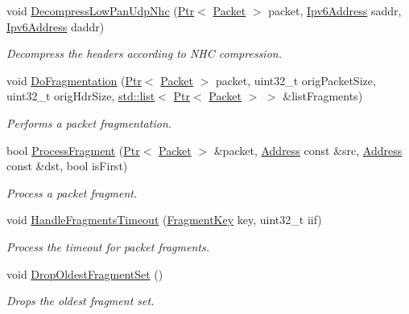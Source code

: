 \begin{DoxyCompactItemize}
void \hyperlink{classns3_1_1SixLowPanNetDevice_a0b31fbe0bdc3a4dd59b9f7426aec8ed8}{Decompress\+Low\+Pan\+Udp\+Nhc} (\hyperlink{classns3_1_1Ptr}{Ptr}$<$ \hyperlink{classns3_1_1Packet}{Packet} $>$ packet, \hyperlink{classns3_1_1Ipv6Address}{Ipv6\+Address} saddr, \hyperlink{classns3_1_1Ipv6Address}{Ipv6\+Address} daddr)
\begin{DoxyCompactList}\small\item\em Decompress the headers according to N\+HC compression. \end{DoxyCompactList}\item 
void \hyperlink{classns3_1_1SixLowPanNetDevice_a88e96024b9eb0c0184c9c1ef26e3aa16}{Do\+Fragmentation} (\hyperlink{classns3_1_1Ptr}{Ptr}$<$ \hyperlink{classns3_1_1Packet}{Packet} $>$ packet, uint32\+\_\+t orig\+Packet\+Size, uint32\+\_\+t orig\+Hdr\+Size, \hyperlink{openflow-interface_8h_afd9bcfa176617760671b67580f536fa7}{std\+::list}$<$ \hyperlink{classns3_1_1Ptr}{Ptr}$<$ \hyperlink{classns3_1_1Packet}{Packet} $>$ $>$ \&list\+Fragments)
\begin{DoxyCompactList}\small\item\em Performs a packet fragmentation. \end{DoxyCompactList}\item 
bool \hyperlink{classns3_1_1SixLowPanNetDevice_a8ae23f88e38059a0096bf87e58007240}{Process\+Fragment} (\hyperlink{classns3_1_1Ptr}{Ptr}$<$ \hyperlink{classns3_1_1Packet}{Packet} $>$ \&packet, \hyperlink{classns3_1_1Address}{Address} const \&src, \hyperlink{classns3_1_1Address}{Address} const \&dst, bool is\+First)
\begin{DoxyCompactList}\small\item\em Process a packet fragment. \end{DoxyCompactList}\item 
void \hyperlink{classns3_1_1SixLowPanNetDevice_a9a88d53c1d9702b93470d5cbb1e526e9}{Handle\+Fragments\+Timeout} (\hyperlink{classns3_1_1SixLowPanNetDevice_a8e3be88fc6596428b23fb7b220f8e148}{Fragment\+Key} key, uint32\+\_\+t iif)
\begin{DoxyCompactList}\small\item\em Process the timeout for packet fragments. \end{DoxyCompactList}\item 
void \hyperlink{classns3_1_1SixLowPanNetDevice_a5b3e75cf412c0fbd9b67e8bf092cc8fe}{Drop\+Oldest\+Fragment\+Set} ()
\begin{DoxyCompactList}\small\item\em Drops the oldest fragment set. \end{DoxyCompactList}\end{DoxyCompactItemize}

